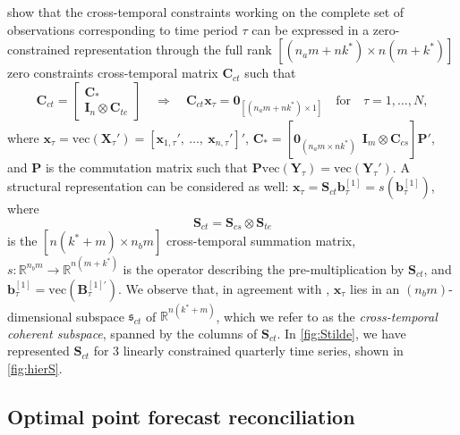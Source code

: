 \documentclass[12pt]{article}
\newcommand{\bvet}{\bm{b}}
\newcommand{\xvet}{\bm{x}}
\newcommand{\Bvet}{\bm{B}}
\newcommand{\Cvet}{\bm{C}}
\newcommand{\Ivet}{\bm{I}}
\newcommand{\Pvet}{\bm{P}}
\newcommand{\Svet}{\bm{S}}
\newcommand{\Xvet}{\bm{X}}
\newcommand{\Yvet}{\bm{Y}}
\newcommand{\Zerovet}{\bm{0}}
\theoremstyle{definition}
\begin{document}
\cite{difonzo2023} show that the cross-temporal constraints working on the complete set of observations corresponding to time period $\tau$ can be expressed in a zero-constrained representation through the full rank $\left[(n_am+nk^\ast)\times n(m+k^\ast)\right]$ zero constraints cross-temporal matrix $\Cvet_{ct}$ such that
\begin{equation}
	\label{eq:Cct}
	\Cvet_{ct} = \begin{bmatrix}
		\Cvet_\ast \\
		\Ivet_n \otimes \Cvet_{te}
	\end{bmatrix} \quad \Longrightarrow \quad
	\Cvet_{ct} \xvet_{\tau} = \Zerovet_{[(n_am+nk^\ast)\times1]} \quad \mathrm{for} \quad \tau = 1,\dots,N,
\end{equation}
where $\xvet_{\tau} = \mathrm{vec}(\Xvet_{\tau}') = [\xvet_{1, \tau}',~ 	\dots, ~ \xvet_{n, \tau}']'$, $\Cvet_\ast = [\Zerovet_{(n_a m\times nk^\ast)} ~~ \Ivet_m \otimes \Cvet_{cs}]\Pvet'$, and $\Pvet$ is the commutation matrix \citep[][p. 54]{magnus2019} such that $\Pvet \mathrm{vec}(\Yvet_{\tau}) = \mathrm{vec}(\Yvet_{\tau}')$. A structural representation can be considered as well: $\xvet_\tau = \Svet_{ct}\bvet^{[1]}_\tau = s(\bvet_{\tau}^{[1]})$, where
\begin{equation}
	\label{eq:Sct}
	\Svet_{ct} = \Svet_{cs} \otimes \Svet_{te}
\end{equation}
is the $\left[n(k^\ast+m)\times n_b m\right]$ cross-temporal summation matrix, $s: \mathbb{R}^{n_b m} \rightarrow \mathbb{R}^{n(m+k^\ast)}$ is the operator describing the pre-multiplication by $\Svet_{ct}$, and $\bvet^{[1]}_\tau = \mathrm{vec}(\Bvet^{[1]\prime}_{\tau})$. We observe that, in agreement with \cite{panagiotelis2021}, $\xvet_{\tau}$ lies in an $(n_b m)$-dimensional subspace $\mathfrak{s}_{ct}$ of $\mathbb{R}^{n(k^\ast+m)}$, which we refer to as the \textit{cross-temporal coherent subspace}, spanned by the columns of $\Svet_{ct}$. In \autoref{fig:Stilde}, we have represented $\Svet_{ct}$ for 3 linearly constrained quarterly time series, shown in \autoref{fig:hierS}.

\subsection{Optimal point forecast reconciliation}\label{ssec:oct}
\end{document}

